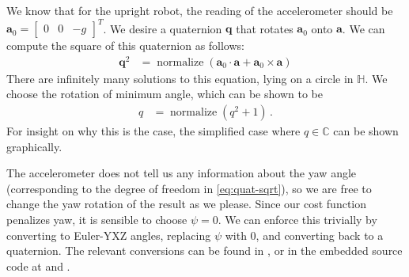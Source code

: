\documentclass[main.tex]{subfiles}
\begin{document}
	We know that for the upright robot, the reading of the accelerometer should be $\bm{a}_0 = \begin{bmatrix}0 & 0 & -g\end{bmatrix}^T$\footnotemark. We desire a quaternion $\bm{q}$ that rotates $\bm{a}_0$ onto $\bm{a}$. We can compute the square of this quaternion as follows:
	\begin{align}
		\bm{q}^2
			&= \operatorname{normalize}\left(
				\bm{a}_0 \cdot \bm{a} + \bm{a}_0 \times \bm{a}
			\right)
			\label{eq:quat-sqrt}
	\end{align}
	There are infinitely many solutions to this equation, lying on a circle in $\mathbb{H}$.
	We choose the rotation of minimum angle, which can be shown to be
	\begin{align}
		q &= \operatorname{normalize}(q^2 + 1)\,.
	\end{align}
	For insight on why this is the case, the simplified case where $q\in\mathbb{C}$ can be shown graphically.

	The accelerometer does not tell us any information about the yaw angle (corresponding to the degree of freedom in \cref{eq:quat-sqrt}), so we are free to change the yaw rotation of the result as we please.
	Since our cost function penalizes yaw, it is sensible to choose $\psi = 0$.
	We can enforce this trivially by converting to Euler-YXZ angles, replacing $\psi$ with $0$, and converting back to a quaternion\footnotemark. The relevant conversions can be found in \cite[eq~362 and 369]{diebel2006representing}, or in the embedded source code at  and .


\bib
\end{document}
